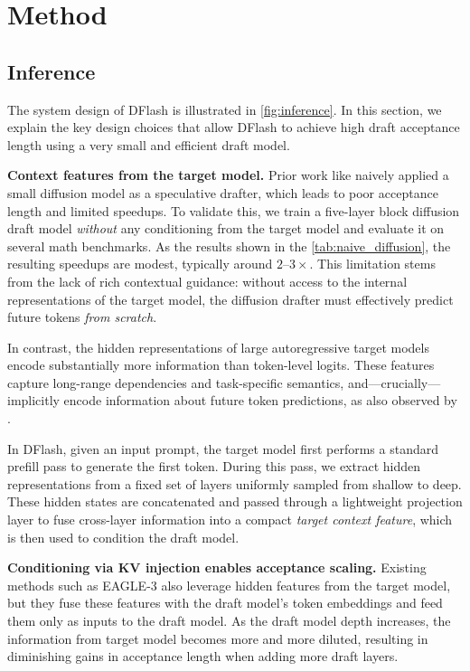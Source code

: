 \section{Method}
\label{sec:method}

\subsection{Inference}
\label{sec:inference}

The system design of DFlash is illustrated in \autoref{fig:inference}. In this section, we explain the key design choices that allow DFlash to achieve high draft acceptance length using a very small and efficient draft model.

\textbf{Context features from the target model.  } Prior work like \citet{an2025pardacceleratingllminference} naively applied a small diffusion model as a speculative drafter, which leads to poor acceptance length and limited speedups. To validate this, we train a five-layer block diffusion draft model \emph{without} any conditioning from the target model and evaluate it on several math benchmarks. As the results shown in the \autoref{tab:naive_diffusion}, the resulting speedups are modest, typically around $2$--$3\times$. This limitation stems from the lack of rich contextual guidance: without access to the internal representations of the target model, the diffusion drafter must effectively predict future tokens \textit{from scratch}.

In contrast, the hidden representations of large autoregressive target models encode substantially more information than token-level logits. These features capture long-range dependencies and task-specific semantics, and—crucially—implicitly encode information about future token predictions, as also observed by \citet{samragh2025llmknowsfutureuncovering}.

In DFlash, given an input prompt, the target model first performs a standard prefill pass to generate the first token. During this pass, we extract hidden representations from a fixed set of layers uniformly sampled from shallow to deep. These hidden states are concatenated and passed through a lightweight projection layer to fuse cross-layer information into a compact \emph{target context feature}, which is then used to condition the draft model.

\textbf{Conditioning via KV injection enables acceptance scaling.  } Existing methods such as EAGLE-3 also leverage hidden features from the target model, but they fuse these features with the draft model’s token embeddings and feed them only as inputs to the draft model. As the draft model depth increases, the information from target model becomes more and more diluted, resulting in diminishing gains in acceptance length when adding more draft layers.


